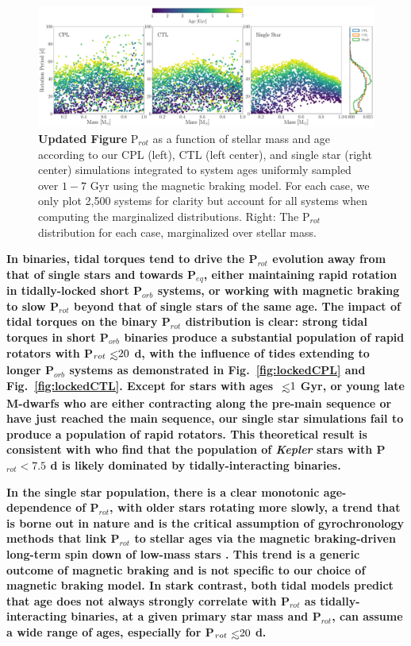 \documentclass[twocolumn]{aastex61}
\def\lsim{~\rlap{$<$}{\lower 1.0ex\hbox{$\sim$}}}
\newcommand{\xxx}[1]{{\textbf{#1}}}
\newcommand{\kepler}[0]{\textit{Kepler}\xspace}
\begin{document}
\begin{figure}[t]
	\includegraphics[width=\textwidth]{../Plots/protDist.pdf}
   \caption{\xxx{Updated Figure} P$_{rot}$ as a function of stellar mass and age according to our CPL (left), CTL (left center), and single star (right center) simulations integrated to system ages uniformly sampled over $1-7$ Gyr using the \citet{Matt2015} magnetic braking model. For each case, we only plot 2,500 systems for clarity but account for all systems when computing the marginalized distributions. Right: The P$_{rot}$ distribution for each case, marginalized over stellar mass.}%
    \label{fig:protDist}%
\end{figure}

\xxx{In binaries, tidal torques tend to drive the P$_{rot}$ evolution away from that of single stars and towards P$_{eq}$, either maintaining rapid rotation in tidally-locked short P$_{orb}$ systems, or working with magnetic braking to slow P$_{rot}$ beyond that of single stars of the same age. The impact of tidal torques on the binary P$_{rot}$ distribution is clear: strong tidal torques in short P$_{orb}$ binaries produce a substantial population of rapid rotators with P$_{rot} \lsim 20$ d, with the influence of tides extending to longer P$_{orb}$ systems as demonstrated in Fig.~\ref{fig:lockedCPL} and Fig.~\ref{fig:lockedCTL}. Except for stars with ages $\lsim 1$ Gyr, or young late M-dwarfs who are either contracting along the pre-main sequence or have just reached the main sequence, our single star simulations fail to produce a population of rapid rotators. This theoretical result is consistent with \citet{Simonian2018} who find that the population of \kepler stars with P$_{rot} < 7.5$ d is likely dominated by tidally-interacting binaries.} 

\xxx{In the single star population, there is a clear monotonic age-dependence of P$_{rot}$, with older stars rotating more slowly, a trend that is borne out in nature and is the critical assumption of gyrochronology methods that link P$_{rot}$ to stellar ages via the magnetic braking-driven long-term spin down of low-mass stars \citep[e.g.][]{Skumanich1972,Barnes2003,Barnes2007,Mamajek2008,Barnes2010,Meibom2015}. This trend is a generic outcome of magnetic braking and is not specific to our choice of magnetic braking model. In stark contrast, both tidal models predict that age does not always strongly correlate with P$_{rot}$ as tidally-interacting binaries, at a given primary star mass and P$_{rot}$, can assume a wide range of ages, especially for P$_{rot} \lsim 20$ d.} 
\end{document}
